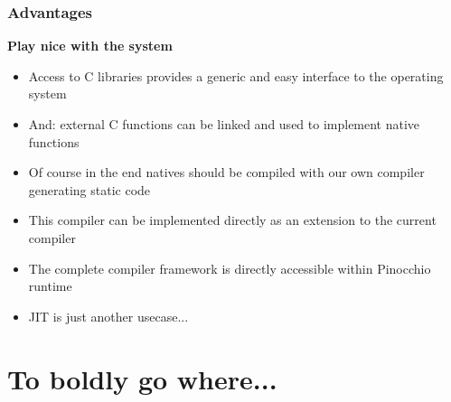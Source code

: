 \documentclass{beamer}
\begin{document}
\begin{frame}[fragile]
    \frametitle{Advantages}
    {\bf Play nice with the system}
    \begin{itemize}
        \item Access to C libraries provides a generic and easy interface to the operating system
        \item And: external C functions can be linked and used to implement native functions
        \item Of course in the end natives should be compiled with our own 
                compiler generating static code
        \item This compiler can be implemented directly as an extension to the current compiler
        \item The complete compiler framework is directly accessible within Pinocchio runtime
        \item JIT is just another usecase...
    \end{itemize}
\end{frame}

\section{To boldly go where...}
\end{document}
